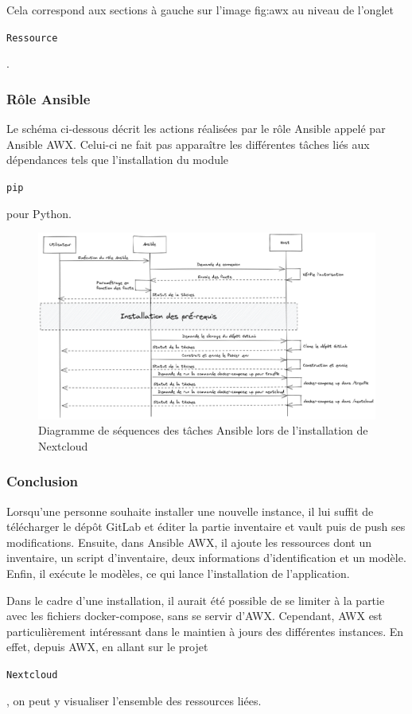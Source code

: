 \documentclass[12pt]{article}
\begin{document}
Cela correspond aux sections à gauche sur l'image \refname{fig:awx} au niveau de l'onglet \begin{code}\texttt{Ressource}\end{code}.

\subsubsection{Rôle \gls{Ansible}}
Le schéma ci-dessous décrit les actions réalisées par le rôle \gls{Ansible} appelé par \gls{Ansible} AWX. 
Celui-ci ne fait pas apparaître les différentes tâches liés aux dépendances tels que l'installation du module \begin{code}\texttt{pip}\end{code} pour Python.

\begin{figure}[!ht]
    \centering
    \includegraphics[width=\textwidth]{src/ansible_nextcloud.png}
    \caption{Diagramme de séquences des tâches \gls{Ansible} lors de l'installation de \gls{Nextcloud}}
    \label{fig:nextcloud_ansible}
\end{figure}

\newpage
\subsubsection{Conclusion}
Lorsqu'une personne souhaite installer une nouvelle instance, il lui suffit de télécharger le dépôt \gls{GitLab} et éditer la partie inventaire et vault puis de push ses modifications. 
Ensuite, dans \gls{Ansible} AWX, il ajoute les ressources dont un inventaire, un script d'inventaire, deux informations d'identification et un modèle. 
Enfin, il exécute le modèles, ce qui lance l'installation de l'application.

Dans le cadre d'une installation, il aurait été possible de se limiter à la partie avec les fichiers docker-compose, sans se servir d'AWX. 
Cependant, AWX est particulièrement intéressant dans le maintien à jours des différentes instances. 
En effet, depuis AWX, en allant sur le projet \begin{code}\texttt{\gls{Nextcloud}}\end{code}, on peut y visualiser l'ensemble des ressources liées.
\end{document}
